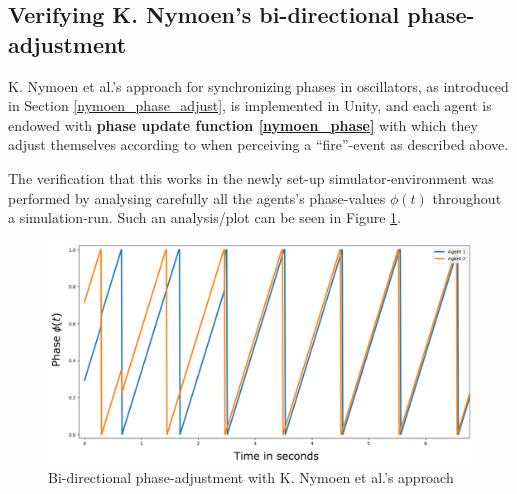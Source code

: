 	
	
	\subsection{Verifying K. Nymoen's bi-directional phase-adjustment} %
	
	K. Nymoen et al.'s approach for synchronizing phases in oscillators, as introduced in Section \ref{nymoen_phase_adjust}, is implemented in Unity, and each agent is endowed with \textbf{phase update function \eqref{nymoen_phase}} with which they adjust themselves according to when perceiving a ``fire''-event as described above.
	
	The verification that this works in the newly set-up simulator-environment was performed by analysing carefully all the agents's phase-values $\phi(t)$ throughout a simulation-run. Such an analysis/plot can be seen in Figure \ref{fig:nymoen_phase}.
	
	\begin{figure}[h]
		\centering
		\includegraphics[width=0.9\linewidth]{Assets/DocSegments/Chapters/Implementation/Figures/Illustrations/KNymoenPhaseAdjustmentSecondTry.pdf}
		\caption[Illustration of K. Nymoen's bi-directional phase-adjustment]{Bi-directional phase-adjustment with K. Nymoen et al.'s approach}
		\label{fig:nymoen_phase}
	\end{figure}
	
	
	
